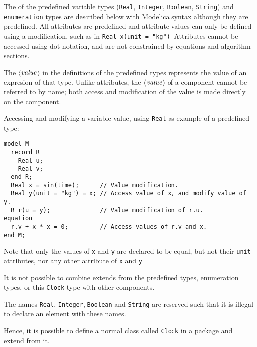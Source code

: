 The  of the predefined variable types (\lstinline!Real!, \lstinline!Integer!, \lstinline!Boolean!, \lstinline!String!) and \lstinline!enumeration! types are described below with Modelica syntax although they are predefined.
All attributes are predefined and attribute values can only be defined using a modification, such as in \lstinline!Real x(unit = "kg")!.
Attributes cannot be accessed using dot notation, and are not constrained by equations and algorithm sections.

The $\langle$$\mbox{\emph{value}}$$\rangle$ in the definitions of the predefined types represents the value of an expresion of that type.
Unlike attributes, the $\langle$$\mbox{\emph{value}}$$\rangle$ of a component cannot be referred to by name; both access and modification of the value is made directly on the component.

\begin{example}
Accessing and modifying a variable value, using \lstinline!Real! as example of a predefined type:
\begin{lstlisting}[language=modelica]
model M
  record R
    Real u;
    Real v;
  end R;
  Real x = sin(time);      // Value modification.
  Real y(unit = "kg") = x; // Access value of x, and modify value of y.
  R r(u = y);              // Value modification of r.u.
equation
  r.v + x * x = 0;         // Access values of r.v and x.
end M;
\end{lstlisting}
Note that only the values of \lstinline!x! and \lstinline!y! are declared to be equal, but not their \lstinline!unit! attributes, nor any other attribute of \lstinline!x! and \lstinline!y!
\end{example}

It is not possible to combine extends from the predefined types, enumeration types, or this \lstinline!Clock! type with other components.

The names \lstinline!Real!, \lstinline!Integer!, \lstinline!Boolean! and \lstinline!String! are reserved such that it is illegal to declare an element with these names.

\begin{nonnormative}
Hence, it is possible to define a normal class called \lstinline!Clock! in a package and extend from it.
\end{nonnormative}

